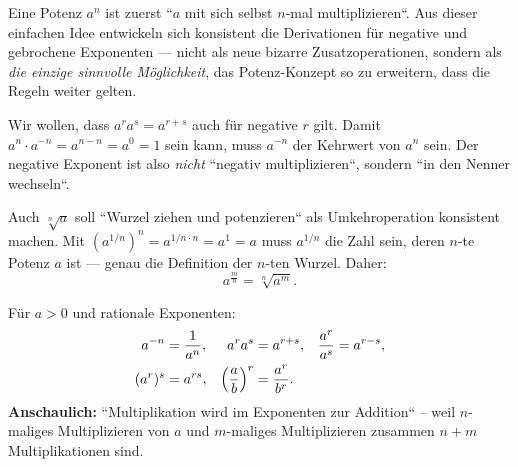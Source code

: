 


Eine Potenz $a^n$ ist zuerst ``$a$ mit sich selbst $n$-mal
multiplizieren``. Aus dieser einfachen Idee entwickeln sich konsistent
die Derivationen für negative und gebrochene Exponenten --- nicht
als neue bizarre Zusatzoperationen, sondern als \emph{die einzige sinnvolle
Möglichkeit}, das Potenz-Konzept so zu erweitern, dass die Regeln
weiter gelten.

\begin{werkzeugkasten}[Warum $a^{-n}=1/a^n$?]
Wir wollen, dass $a^r a^s=a^{r+s}$ auch für negative $r$ gilt. Damit
$a^n\cdot a^{-n}=a^{n-n}=a^0=1$ sein kann, muss $a^{-n}$ der Kehrwert von
$a^n$ sein. Der negative Exponent ist also \emph{nicht} ``negativ
multiplizieren``, sondern ``in den Nenner wechseln``.
\end{werkzeugkasten}

\begin{werkzeugkasten}
Auch $\sqrt[n]{a}$ soll ``Wurzel ziehen und potenzieren`` als
Umkehroperation konsistent machen. Mit $(a^{1/n})^n=a^{1/n\cdot n}=a^1=a$
muss $a^{1/n}$ die Zahl sein, deren $n$-te Potenz $a$ ist --- genau die
Definition der $n$-ten Wurzel. Daher:
\begin{equation}
  a^{\frac mn}=\sqrt[n]{a^m}.
\end{equation}
\end{werkzeugkasten}

\begin{werkzeugkasten}
Für $a>0$ und rationale Exponenten:
\begin{align}
  a^{-n}&=\frac1{a^n}, &
  a^{r} a^{s}&=a^{r+s}, &
  \frac{a^{r}}{a^{s}}&=a^{r-s}, \\
  (a^{r})^{s}&=a^{rs}, &
  \Bigl(\frac ab\Bigr)^{r}&=\frac{a^{r}}{b^{r}} .
\end{align}
\textbf{Anschaulich:} ``Multiplikation wird im Exponenten zur Addition``
-- weil $n$-maliges Multiplizieren von $a$ und $m$-maliges Multiplizieren
zusammen $n+m$ Multiplikationen sind.
\end{werkzeugkasten}

